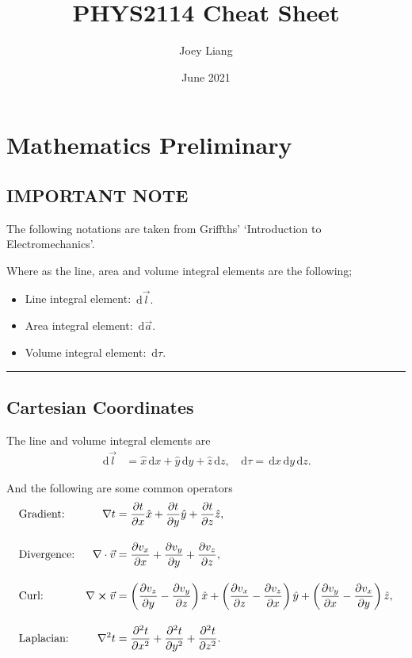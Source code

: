 \documentclass[a4paper]{article}
\title{PHYS2114 Cheat Sheet}
\date{June 2021}
\author{Joey Liang}
\newcommand{\dmr}[1]{\, \mathrm{d}#1} %
\numberwithin{equation}{subsection}
\begin{document}
\maketitle
\newpage
\tableofcontents
\newpage
\section{Mathematics Preliminary}
\subsection{IMPORTANT NOTE}
The following notations are taken from Griffths' `Introduction to Electromechanics'.\cite{Griffiths:611579}

Where as the line, area and volume integral elements are the following;
\begin{itemize}
    \item Line integral element: $\dmr{\vec{l}}.$
    \item Area integral element: $\dmr{\vec{a}}.$ 
    \item Volume integral element: $\dmr{\tau}.$
\end{itemize}

\par\noindent\rule{\textwidth}{0.4pt}

\subsection{Cartesian Coordinates}
The line and volume integral elements are
\begin{align*}
    \dmr{\vec{l}} &= \hat{x}\dmr{x} + \hat{y}\dmr{y} + \hat{z}\dmr{z}, & \dmr{\tau} = \dmr{x}\dmr{y}\dmr{z}.
\end{align*}

And the following are some common operators
\begin{align*}
    &\text{Gradient:} &\nabla t  &= \pdv{t}{x}\hat{x} + \pdv{t}{y}\hat{y} + \pdv{t}{z}\hat{z},\\[1em]
    &\text{Divergence:} &\nabla\cdot\vec{v} &= \pdv{v_x}{x} + \pdv{v_y}{y} + \pdv{v_z}{z},\\[1em]
    &\text{Curl:} &\nabla \cross \vec{v} &= \left(\pdv{v_z}{y}-\pdv{v_y}{z}\right)\hat{x} + \left(\pdv{v_x}{z}-\pdv{v_z}{x}\right)\hat{y} + \left(\pdv{v_y}{x}-\pdv{v_x}{y}\right)\hat{z},\\[1em]
    &\text{Laplacian:} &\laplacian t &= \pdv[2]{t}{x} + \pdv[2]{t}{y} +\pdv[2]{t}{z}. 
\end{align*}
\end{document}

